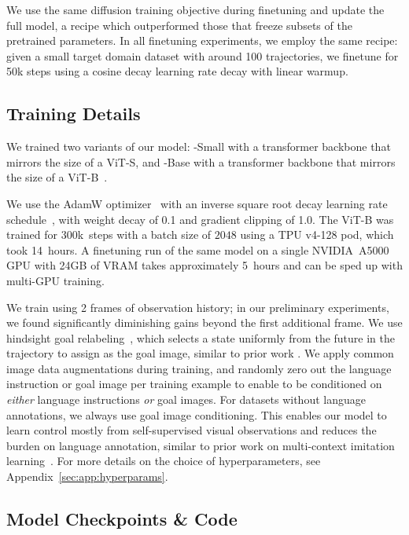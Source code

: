 We use the same diffusion training objective during finetuning and update the full model, a recipe which outperformed those that freeze subsets of the pretrained parameters. In all finetuning experiments, we employ the same recipe: given a small target domain dataset with around 100 trajectories, we finetune for 50k steps using a cosine decay learning rate decay with linear warmup.


\subsection{Training Details}
\label{sec:training_details}
We trained two variants of our model: \method-Small with a transformer backbone that mirrors the size of a ViT-S, and \method-Base with a transformer backbone that mirrors the size of a ViT-B~\citep{dosovitskiy2020image}. 

We use the AdamW optimizer~\citep{loshchilov2017decoupled} with an inverse square root decay learning rate schedule~\citep{zhai2022scaling}, with weight decay of 0.1 and gradient clipping of 1.0. The ViT-B was trained for 300k~steps with a batch size of $2048$ using a TPU v4-128 pod, which took 14~hours. A finetuning run of the same model on a single NVIDIA~A5000 GPU with 24GB of VRAM takes approximately 5~hours and can be sped up with multi-GPU training. 

We train using 2 frames of observation history; in our preliminary experiments, we found significantly diminishing gains beyond the first additional frame. We use hindsight goal relabeling~\citep{andrychowicz2017hindsight}, which selects a state uniformly from the future in the trajectory to assign as the goal image, similar to prior work \citep{lynch2020language, walke2023bridgedata, shah2023vint,rosetebeas2022latent,mees2023grounding}. We apply common image data augmentations during training, and randomly zero out the language instruction or goal image per training example to enable \method{} to be conditioned on \emph{either} language instructions \emph{or} goal images. For datasets without language annotations, we always use goal image conditioning. This enables our model to learn control mostly from self-supervised visual observations and reduces the burden on language annotation, similar to prior work on multi-context imitation learning~\citep{lynch2020language,mees2022calvin,mees2022matters,mees2023grounding}. For more details on the choice of hyperparameters, see Appendix~\ref{sec:app:hyperparams}.


\subsection{Model Checkpoints \& Code}
\label{sec:code}

